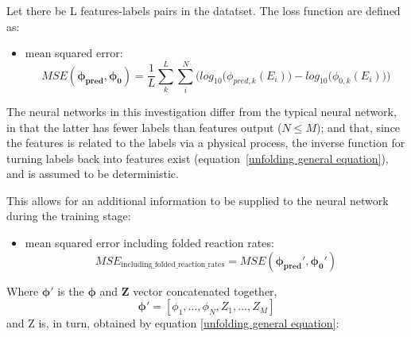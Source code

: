 \documentclass[a4paper, 12pt]{article}
\newcommand{\ve}[1]{\boldsymbol{#1}}
\begin{document}
    Let there be L features-labels pairs in the datatset. The loss function are defined as:
    \begin{itemize}
        \item mean squared error:
        \begin{equation}\label{MSE}
            MSE(\ve{\phi_{pred}},\ve{\phi_0}) = \frac{1}{L} \sum_{k}^L \sum_i^N \bigg( log_{10}\big(\phi_{pred,k}(E_i)\big)-log_{10}\big(\phi_{0,k}(E_i)\big) \bigg)
        \end{equation}
    \end{itemize}
    The neural networks in this investigation differ from the typical neural network, in that the latter has fewer labels than features output ($N \le M$); and that, since the features is related to the labels via a physical process, the inverse function for turning labels back into features exist (equation~\ref{unfolding general equation}), and is assumed to be deterministic.
    
    This allows for an additional information to be supplied to the neural network during the training stage:
        
    \begin{itemize}
        \item mean squared error including folded reaction rates:
        \begin{equation}\label{MSE_including_folded_reaction_rates}
            MSE_{\text{including\_folded\_reaction\_rates}}=MSE(\ve{\phi_{pred}'},\ve{\phi_{0}'})
        \end{equation}
    \end{itemize}
    Where $\ve{\phi'}$ is the $\ve{\phi}$ and $\ve{Z}$ vector concatenated together,
    \begin{equation}\label{NNregularization}
        \ve{\phi'} = [\phi_1, ..., \phi_N, Z_1, ..., Z_M]
    \end{equation}
    and Z is, in turn, obtained by equation \ref{unfolding general equation}:
\end{document}
